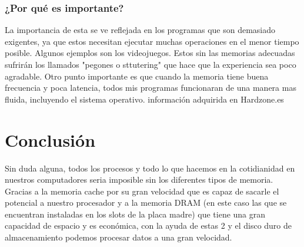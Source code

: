 \documentclass{article}
\begin{document}
\subsubsection{¿Por qué es importante?}
La importancia de esta se ve reflejada en los programas que son demasiado exigentes, ya que estos necesitan ejecutar muchas operaciones en el menor tiempo posible. Algunos ejemplos son los videojuegos. Estos sin las memorias adecuadas sufrirán los llamados "pegones o sttutering" que hace que la experiencia sea poco agradable. Otro punto importante es que cuando la memoria tiene buena frecuencia y poca latencia, todos mis programas funcionaran de una manera mas fluida, incluyendo el sistema operativo.
información adquirida en Hardzone.es\cite{hardzone}

\section{Conclusión} \label{Conclusión}
Sin duda alguna, todos los procesos y todo lo que hacemos en la cotidianidad en nuestros computadores seria imposible sin los diferentes tipos de memoria. Gracias a la memoria cache por su gran velocidad que es capaz de sacarle el potencial a nuestro procesador y a la memoria DRAM (en este caso las que se encuentran instaladas en los slots de la placa madre) que tiene una gran capacidad de espacio y es económica, con la ayuda de estas 2 y el disco duro de almacenamiento podemos procesar datos a una gran velocidad.


\end{document}
